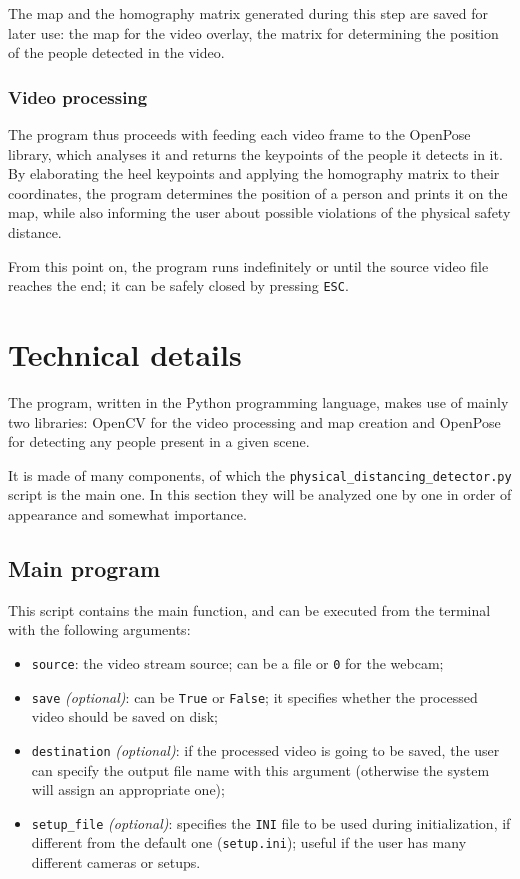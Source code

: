 \documentclass[12pt]{article}
\begin{document}
The map and the homography matrix generated during this step are saved for later use: the map for the video overlay, the matrix for determining the position of the people detected in the video.

\subsubsection{Video processing}
\label{chap:processing}
The program thus proceeds with feeding each video frame to the OpenPose library, which analyses it and returns the keypoints of the people it detects in it. By elaborating the heel keypoints and applying the homography matrix to their coordinates, the program determines the position of a person and prints it on the map, while also informing the user about possible violations of the physical safety distance.

From this point on, the program runs indefinitely or until the source video file reaches the end; it can be safely closed by pressing \lstinline{ESC}.


\section{Technical details}
\label{chap:tech}
The program, written in the Python programming language, makes use of mainly two libraries: OpenCV for the video processing and map creation and OpenPose for detecting any people present in a given scene.

It is made of many components, of which the \lstinline{physical_distancing_detector.py} script is the main one. In this section they will be analyzed one by one in order of appearance and somewhat importance.


\subsection{Main program}
\label{chap:main}
This script contains the main function, and can be executed from the terminal with the following arguments:
\begin{itemize}
\item \lstinline{source}: the video stream source; can be a file or \lstinline{0} for the webcam;
\item \lstinline{save} \textit{(optional)}: can be \lstinline{True} or \lstinline{False}; it specifies whether the processed video should be saved on disk;
\item \lstinline{destination} \textit{(optional)}: if the processed video is going to be saved, the user can specify the output file name with this argument (otherwise the system will assign an appropriate one);
\item \lstinline{setup_file} \textit{(optional)}: specifies the \lstinline{INI} file to be used during initialization, if different from the default one (\lstinline{setup.ini}); useful if the user has many different cameras or setups.
\end{itemize}
\end{document}
